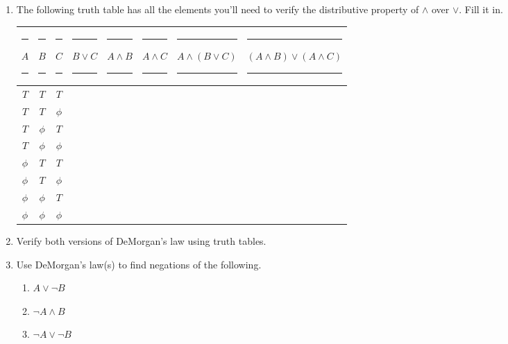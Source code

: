 \documentclass{amsart}
\begin{document}
\begin{enumerate}
\vfill

\newpage

\item The following truth table has all the elements you'll need to verify the distributive property of $\land$ over $\lor$. Fill it in.

\vspace{.3in}

\hspace{-1in}\begin{tabular}{c|cc||c|c|c||c|c}
\rule{4pt}{0pt} $A$ \rule{4pt}{0pt} & \rule{4pt}{0pt} $B$ \rule{4pt}{0pt} & \rule{4pt}{0pt} $C$ \rule{4pt}{0pt} & \rule{4pt}{0pt} $B \lor C$ \rule{4pt}{0pt} & \rule{4pt}{0pt} $A \land B$ \rule{4pt}{0pt} & \rule{4pt}{0pt} $A \land C$ \rule{4pt}{0pt} & \rule{4pt}{0pt} $A \land (B \lor C)$ \rule{4pt}{0pt} & \rule{4pt}{0pt} $(A \land B) \lor (A \land C)$ \rule{4pt}{0pt} \\ \hline
 \rule[-4pt]{0pt}{20pt} $T$ & $T$ & $T$ & & & & & \\
 \rule[-4pt]{0pt}{20pt} $T$ & $T$ & $\phi$ & & & & & \\
 \rule[-4pt]{0pt}{20pt} $T$ & $\phi$ & $T$ & & & & & \\
 \rule[-4pt]{0pt}{20pt} $T$ & $\phi$ & $\phi$ & & & & & \\ \hline
 \rule[-4pt]{0pt}{20pt} $\phi$ & $T$ & $T$ & & & & & \\
 \rule[-4pt]{0pt}{20pt} $\phi$ & $T$ & $\phi$ & & & & & \\
 \rule[-4pt]{0pt}{20pt} $\phi$ & $\phi$ & $T$ & & & & & \\
 \rule[-4pt]{0pt}{20pt} $\phi$ & $\phi$ & $\phi$ & & & & & \\
\end{tabular}

\vspace{.3in}

\item Verify both versions of DeMorgan's law using truth tables.

\vfill

\newpage

\item Use DeMorgan's law(s) to find negations of the following.

\vspace{.3in}

\begin{enumerate}
\item \rule[-4pt]{0pt}{20pt} $ A \lor \lnot B $
\item \rule[-4pt]{0pt}{20pt} $ \lnot A \land B $
\item \rule[-4pt]{0pt}{20pt} $ \lnot A \lor \lnot B $
\end{enumerate}


\end{enumerate}
\end{document}
